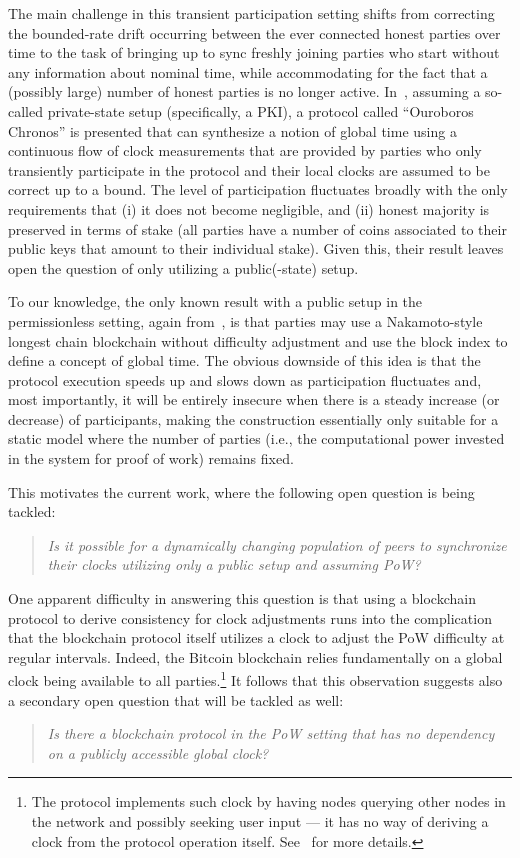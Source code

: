 The main challenge in this transient participation setting shifts from correcting the bounded-rate drift occurring between the ever connected honest parties over time to the task of bringing up to sync freshly joining parties who start without any information about nominal time, while accommodating for the fact that a (possibly large) number of honest parties is no longer active.
%
In~\cite{EC:BGKRZ21}, assuming a so-called private-state setup \cite{RSA:GarKia20} (specifically, a PKI), a protocol called ``Ouroboros Chronos'' is presented that can synthesize a notion of global time using a continuous flow of clock measurements that are provided by parties who only transiently participate in the protocol and their local clocks are assumed to be correct up to a bound.
%
The level of participation fluctuates broadly with the only requirements that (i) it does not become negligible, and (ii) honest majority is preserved in terms of  stake (all parties have a number of coins associated to their public keys that amount to their individual stake).
%
Given this, their result leaves open the question of only utilizing a public(-state) setup.

To our knowledge, the only known result with a public setup in the permissionless setting, again from~\cite{EC:BGKRZ21}, is that parties may use a Nakamoto-style longest chain blockchain without difficulty adjustment and use the block index to define a concept of global time.
%
The obvious downside of this idea is that the protocol execution speeds up and slows down as participation fluctuates and, most importantly, it will be entirely insecure when there is a steady increase (or decrease) of participants, making the construction essentially only suitable for a static model where the number of parties (i.e., the computational power invested in the system for proof of work) remains fixed.

This motivates the current work, where the following open question is being
tackled:
%
\begin{quote}
    \em Is it possible for a dynamically changing population of peers to synchronize their clocks utilizing only a public setup and assuming PoW?
\end{quote}

One apparent difficulty in answering this question is that using a blockchain protocol to derive consistency for clock adjustments runs into the complication that the blockchain protocol itself utilizes a clock to adjust the PoW difficulty at regular intervals.
%
Indeed, the Bitcoin blockchain \cite{Nak08} relies fundamentally on a global clock being available to all parties.\footnote{The protocol implements such clock by having nodes querying other nodes in the network and possibly seeking user input --- it has no way of deriving a clock from the protocol operation itself. See~\cite{EPRINT:GarKiaLeo20} for more details.}
%
It follows that this observation suggests also a secondary open question that
will be tackled as well:
%
\begin{quote}
    \em Is there a blockchain protocol in the PoW setting that has no dependency on a publicly accessible global clock?
\end{quote}


